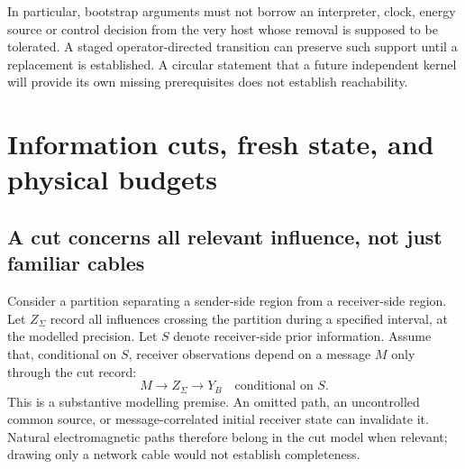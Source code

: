 \documentclass[11pt,a4paper]{article}
\theoremstyle{definition}
\theoremstyle{remark}
\begin{document}
In particular, bootstrap arguments must not borrow an interpreter, clock, energy source or control decision from the very host whose removal is supposed to be tolerated. A staged operator-directed transition can preserve such support until a replacement is established. A circular statement that a future independent kernel will provide its own missing prerequisites does not establish reachability.


\section{Information cuts, fresh state, and physical budgets}\label{sec:cuts}
\subsection{A cut concerns all relevant influence, not just familiar cables}
Consider a partition separating a sender-side region from a receiver-side region. Let $Z_\Sigma$ record all influences crossing the partition during a specified interval, at the modelled precision. Let $S$ denote receiver-side prior information. Assume that, conditional on $S$, receiver observations depend on a message $M$ only through the cut record:
\begin{equation}\label{eq:markovcut}
 M\longrightarrow Z_\Sigma\longrightarrow Y_B
 \quad\text{conditional on }S.
\end{equation}
This is a substantive modelling premise. An omitted path, an uncontrolled common source, or message-correlated initial receiver state can invalidate it. Natural electromagnetic paths therefore belong in the cut model when relevant; drawing only a network cable would not establish completeness.
\end{document}
